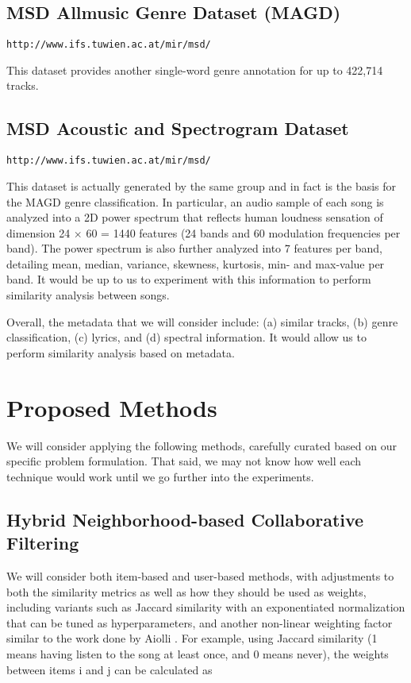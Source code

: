 \documentclass[conference]{IEEEtran}
\begin{document}
\subsection{MSD Allmusic Genre Dataset (MAGD)}

{\small \texttt{http://www.ifs.tuwien.ac.at/mir/msd/}}

This dataset provides another single-word genre annotation for up to 422,714 tracks.

\subsection{MSD Acoustic and Spectrogram Dataset}

{\small \texttt{http://www.ifs.tuwien.ac.at/mir/msd/}}

This dataset is actually generated by the same group and in fact is the basis for the MAGD genre classification. In particular, an audio sample of each song is analyzed into a 2D power spectrum that reflects human loudness sensation \cite{lidy2005evaluation} of dimension 24 $\times$ 60 = 1440 features (24 bands and 60 modulation frequencies per band). The power spectrum is also further analyzed into 7 features per band, detailing mean, median, variance, skewness, kurtosis, min- and max-value per band. It would be up to us to experiment with this information to perform similarity analysis between songs.

Overall, the metadata that we will consider include: (a) similar tracks, (b) genre classification, (c) lyrics, and (d) spectral information. It would allow us to perform similarity analysis based on metadata.

\section{Proposed Methods}

We will consider applying the following methods, carefully curated based on our specific problem formulation. That said, we may not know how well each technique would work until we go further into the experiments.

\subsection{Hybrid Neighborhood-based Collaborative Filtering}

We will consider both item-based and user-based methods, with adjustments to both the similarity metrics as well as how they should be used as weights, including variants such as Jaccard similarity with an exponentiated normalization that can be tuned as hyperparameters, and another non-linear weighting factor similar to the work done by Aiolli
\cite{aiolli2013efficient}. For example, using Jaccard similarity (1 means having listen to the song at least once, and 0 means never), the weights between items i and j can be calculated as
\end{document}
